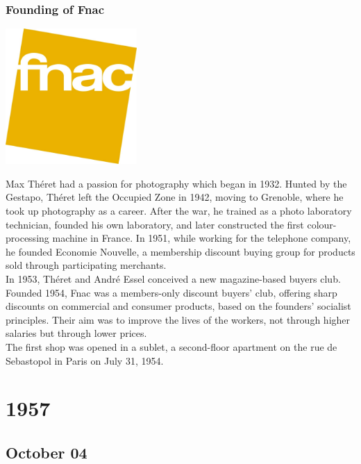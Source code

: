 \documentclass[11pt]{report}
\begin{document}
\subsection{Founding of Fnac}
\vspace{2mm}\begin{center}\includegraphics[width=5cm]{./img/fnacLogo.jpg}\end{center}
Max Théret had a passion for photography which began in 1932. Hunted by the Gestapo, Théret left the Occupied Zone in 1942, moving to Grenoble, where he took up photography as a career. After the war, he trained as a photo laboratory technician, founded his own laboratory, and later constructed the first colour-processing machine in France. In 1951, while working for the telephone company, he founded Economie Nouvelle, a membership discount buying group for products sold through participating merchants.\\ \indent In 1953, Théret and André Essel conceived a new magazine-based buyers club. Founded 1954, Fnac was a members-only discount buyers' club, offering sharp discounts on commercial and consumer products, based on the founders' socialist principles. Their aim was to improve the lives of the workers, not through higher salaries but through lower prices.\\
\indent The first shop was opened in a sublet, a second-floor apartment on the rue de Sebastopol in Paris on July 31, 1954.

\chapter{1957}
\section{October 04}
\end{document}
